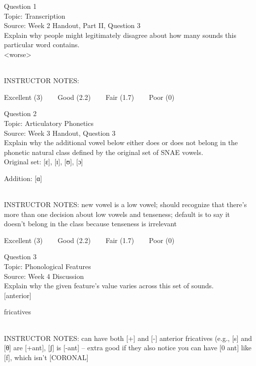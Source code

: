 \documentclass[12pt]{article}
\begin{document}
{\large Question 1}\\

Topic: Transcription\\
Source: Week 2 Handout, Part II, Question 3\\

Explain why people might legitimately disagree about how many sounds this particular word contains.\\

<worse>


~\\
INSTRUCTOR NOTES: 


\vfill
Excellent (3) ~~~ Good (2.2) ~~~ Fair (1.7) ~~~ Poor (0)
\newpage

{\large Question 2}\\

Topic: Articulatory Phonetics\\
Source: Week 3 Handout, Question 3\\

Explain why the additional vowel below either does or does not belong in the phonetic natural class defined by the original set of SNAE vowels.\\

Original set: {[ɛ]}, {[ɪ]}, {[ʊ]}, {[ɔ]}

Addition: {[ɑ]}


~\\
INSTRUCTOR NOTES: new vowel is a low vowel; should recognize that there's more than one decision about low vowels and tenseness; default is to say it doesn't belong in the class because tenseness is irrelevant


\vfill
Excellent (3) ~~~ Good (2.2) ~~~ Fair (1.7) ~~~ Poor (0)
\newpage

{\large Question 3}\\

Topic: Phonological Features\\
Source: Week 4 Discussion\\

Explain why the given feature's value varies across this set of sounds.\\

{[anterior]}

fricatives


~\\
INSTRUCTOR NOTES: can have both [+] and [-] anterior fricatives (e.g., [s] and [θ] are [+ant], [ʃ] is [-ant] -- extra good if they also notice you can have [0 ant] like [f], which isn't [CORONAL]
\end{document}
